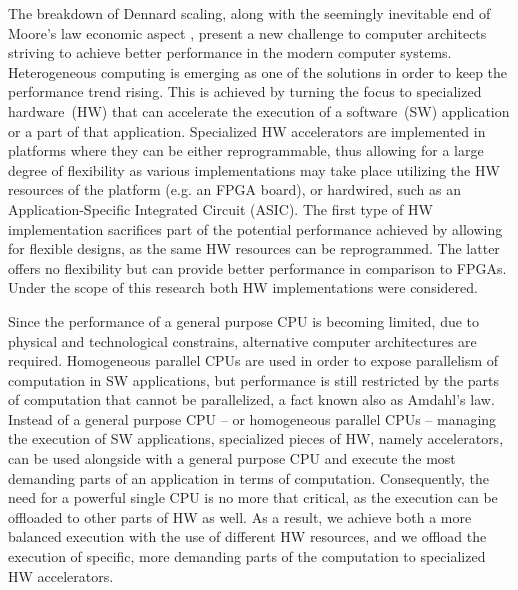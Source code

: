 \documentclass[]{usiinfthesis}
\newcommand{\HW}{{hardware}}
\newcommand{\SW}{{software}}
\begin{document}
The breakdown of Dennard scaling, %
along with the seemingly inevitable 
end of Moore's law economic aspect \cite{simonite2016moore}, present a new challenge to computer 
architects striving to achieve
better performance in the modern computer systems.
Heterogeneous computing is emerging as one of the solutions in order to keep the performance 
trend rising. This is achieved by turning the focus to specialized \HW\ (HW) that 
can accelerate the execution of a \SW\ (SW) application or a part of that application. Specialized HW 
accelerators are implemented in platforms where they can be either reprogrammable, 
thus allowing for a large degree of flexibility as various implementations may take place utilizing
the HW resources of the platform (e.g. an FPGA board), or hardwired, such as an Application-Specific Integrated 
Circuit (ASIC). The first type of HW implementation sacrifices part of the potential 
performance achieved by allowing for flexible designs, as the same HW resources can be reprogrammed.
The latter offers no flexibility but can provide better performance in comparison to FPGAs. Under 
the scope of this research both HW implementations were considered.  \par
%
%
Since the performance of a general purpose CPU is becoming limited, due to physical and technological 
constrains, alternative computer architectures are required. Homogeneous parallel CPUs are used in 
order to expose parallelism of computation in SW applications, but performance is still restricted 
by the parts of computation that cannot be parallelized, a fact known also as Amdahl's law.
Instead of a 
general purpose CPU -- or homogeneous parallel CPUs -- managing the execution of SW applications, 
specialized pieces
of HW, namely accelerators, can be used alongside with a general purpose CPU and execute the
most demanding parts of an application in terms of computation. Consequently, the need for 
a powerful single CPU is no more that critical, as the execution can be offloaded to other
parts of HW as well. %
As a result, we achieve both a more balanced execution with 
the use of different HW resources, and we offload the execution of specific, more demanding 
parts of the computation to specialized HW accelerators.\par
\end{document}
